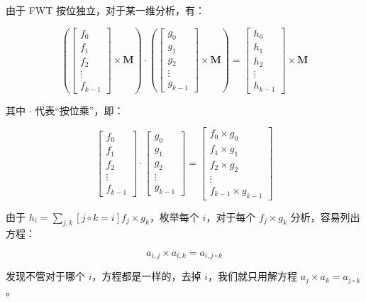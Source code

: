 \documentclass[12pt]{article} %
\begin{document}
由于 FWT 按位独立，对于某一维分析，有：

$$\left(\begin{bmatrix}f_0 \\ f_1 \\ f_2 \\ \vdots \\ f_{k-1} \end{bmatrix}\times \mathbf{M} \right) \cdot \left(\begin{bmatrix}g_0 \\ g_1 \\ g_2 \\ \vdots \\ g_{k-1} \end{bmatrix}\times \mathbf{M}\right) = \begin{bmatrix}h_0 \\ h_1 \\ h_2 \\ \vdots \\ h_{k-1} \end{bmatrix}\times \mathbf{M}$$

其中 $\cdot$ 代表“按位乘”，即：

$$\begin{bmatrix}f_0 \\ f_1 \\ f_2 \\ \vdots \\ f_{k-1} \end{bmatrix} \cdot \begin{bmatrix}g_0 \\ g_1 \\ g_2 \\ \vdots \\ g_{k-1} \end{bmatrix} = \begin{bmatrix}f_0 \times g_0 \\ f_1 \times g_1 \\ f_2 \times g_2 \\ \vdots \\ f_{k-1} \times g_{k-1} \end{bmatrix}$$

由于 $h_{i}=\sum_{j,k} [j \circ k =i]f_{j} \times g_{k}$，枚举每个 $i$，对于每个 $f_j \times g_k$ 分析，容易列出方程：

$$a_{i,j} \times a_{i,k}=a_{i,j \circ k}$$

发现不管对于哪个 $i$，方程都是一样的，去掉 $i$，我们就只用解方程 $a_{j} \times a_{k}=a_{j \circ k}$。
\end{document}

